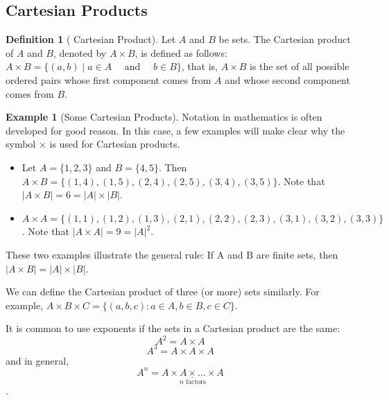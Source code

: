 \documentclass[10pt,]{book}
\theoremstyle{plain}
\theoremstyle{definition}
\newtheorem{definition}[theorem]{Definition}
\theoremstyle{definition}
\theoremstyle{definition}
\newtheorem{example}[theorem]{Example}
\theoremstyle{definition}
\begin{document}
\subsection[Cartesian Products]{Cartesian Products}\label{Cartesian-products}
\begin{definition}[ Cartesian Product]\label{cartesian-product.}
\label{notation-11}
 Let \(A\) and \(B\) be sets. The Cartesian product of \(A\) and \(B\), denoted by \(A\times B\), is defined as follows: \(A\times B = \{(a, b) \mid a \in  A \quad\textrm{ and }\quad b \in  B\}\), that is, \(A\times B\) is the set of all possible ordered pairs whose first component comes from \(A\) and whose second component comes from \(B\).%
\end{definition}
\begin{example}[Some Cartesian Products]\label{example-8}
 Notation in mathematics is often developed for good reason. In this case, a few examples will make clear why the symbol $\times $ is used for Cartesian products.%
\par
\leavevmode%
\begin{itemize}[label=\textbullet]
\item{}  Let \(A = \{1, 2, 3\}\) and \(B = \{4, 5\}\). Then \(A \times  B = \{(1, 4), (1, 5), (2, 4), (2, 5), (3, 4), (3, 5)\}\). Note that \(|A \times B| = 6 = \lvert A \rvert  \times  \lvert B \rvert \). %
\item{}  \(A \times  A = \{(1, 1), (1, 2), (1, 3), (2, 1), (2, 2), (2, 3), (3, 1), (3, 2), (3, 3)\}\). Note that \(|A \times  A| = 9 = {\lvert A \rvert}^2\).%
\end{itemize}
%
\end{example}
These two examples illustrate the general rule: If A and B are finite sets, then \(| A \times B | = \lvert A \rvert  \times  \lvert B \rvert \).%
\par
We can define the Cartesian product of three (or more) sets similarly. For example, \(A \times  B \times  C = \{(a, b, c):a \in  A, b \in  B, c \in C\}\). %
\par
It is common to use exponents if the sets in a Cartesian product are the same: 
\begin{equation*}A^2= A \times  A\end{equation*}
\begin{equation*}A^3=A \times A \times A\end{equation*}
and in general, 
\begin{equation*}A^n =  \underset{n \textrm{ factors}}{\underline{A \times A \times \ldots \times A}}\end{equation*}.%
\typeout{************************************************}
\typeout{************************************************}
\end{document}
